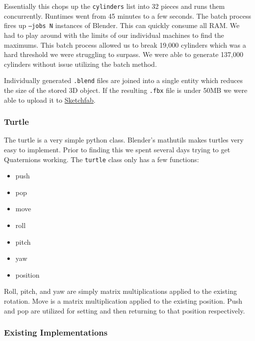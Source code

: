 Essentially this chops up the \texttt{cylinders} list into 32 pieces and runs 
them concurrently. Runtimes went from 45 minutes to a few seconds. The 
batch process fires up \texttt{--jobs N} instances of Blender. This can 
quickly consume all RAM. We had to play around with the limits of our 
individual machines to find the maximums. This batch process allowed us to 
break 19,000 cylinders which was a hard threshold we were struggling to surpass. 
We were able to generate 137,000 cylinders without issue utilizing the batch 
method. 

Individually generated \texttt{.blend} files are joined into a 
single entity which reduces the size of the stored 3D object. If the resulting 
\texttt{.fbx} file is under 50MB we were able to upload it to 
\href{https://sketchfab.com/macattackftw/models}{Sketchfab}. 

\subsubsection{Turtle}
The turtle is a very simple python class. Blender's mathutils makes turtles 
very easy to implement. Prior to finding this we spent several days trying to 
get Quaternions working. The \texttt{turtle} class only has a few 
functions:

\begin{itemize}
    \item push
    \item pop
    \item move
    \item roll
    \item pitch
    \item yaw
    \item position
\end{itemize}

Roll, pitch, and yaw are simply matrix multiplications applied to the existing 
rotation. Move is a matrix multiplication applied to the existing position. 
Push and pop are utilized for setting and then returning to that position 
respectively.


\subsubsection{Existing Implementations}

